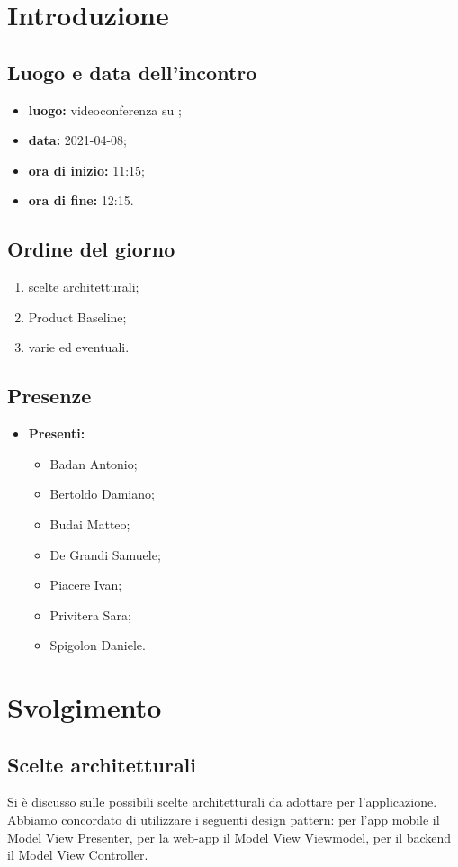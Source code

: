 \section*{Introduzione}
\subsection*{Luogo e data dell'incontro}
\begin{itemize}
	\item \textbf{luogo:} videoconferenza su ;
	\item \textbf{data:}  2021-04-08;
	\item \textbf{ora di inizio:} 11:15;
	\item \textbf{ora di fine:} 12:15.
\end{itemize}

\subsection*{Ordine del giorno}
\begin{enumerate}
	\item scelte architetturali;
	\item Product Baseline;
	\item varie ed eventuali.
\end{enumerate}

\subsection*{Presenze}
\begin{itemize}
	\item \textbf{Presenti:}
	\begin{itemize}
		\item Badan Antonio;
		\item Bertoldo Damiano;
		\item Budai Matteo;
		\item De Grandi Samuele;
		\item Piacere Ivan;
		\item Privitera Sara;
		\item Spigolon Daniele.
	\end{itemize}
\end{itemize}

\section*{Svolgimento}
\subsection*{Scelte architetturali}
Si è discusso sulle possibili scelte architetturali da adottare per l'applicazione. Abbiamo concordato di utilizzare i seguenti design pattern: per l'app mobile il Model View Presenter, per la web-app il Model View Viewmodel, per il backend il Model View Controller.

